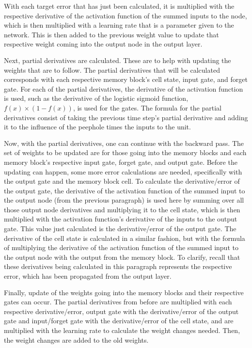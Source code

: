 \documentclass[11pt,letterpaper]{article}
\begin{document}
With each target error that has just been calculated, it is multiplied with the respective derivative of the activation function of the summed inputs to the node, which is then multiplied with a learning rate that is a parameter given to the network. This is then added to the previous weight value to update that respective weight coming into the output node in the output layer.

Next, partial derivatives are calculated. These are to help with updating the weights that are to follow. The partial derivatives that will be calculated corresponds with each respective memory block's cell state, input gate, and forget gate. For each of the partial derivatives, the derivative of the activation function is used, such as the derivative of the logistic sigmoid function, $f(x) \times (1 - f(x))$, is used for the gates. The formula for the partial derivatives consist of taking the previous time step's partial derivative and adding it to the influence of the peephole times the inputs to the unit.

Now, with the partial derivatives, one can continue with the backward pass. 
The set of weights to be updated are for those going into the memory blocks and each memory block's respective input gate, forget gate, and output gate. Before the updating can happen, some more error calculations are needed, specifically with the output gate and the memory block cell. To calculate the derivative/error of the output gate, the derivative of the activation function of the summed input to the output node (from the previous paragraph) is used here by summing over all those output node derivatives and multiplying it to the cell state, which is then multiplied with the activation function's derivative of the inputs to the output gate. This value just calculated is the derivative/error of the output gate. The derivative of the cell state is calculated in a similar fashion, but with the formula of multiplying the derivative of the activation function of the summed input to the output node with the output from the memory block. To clarify, recall that these derivatives being calculated in this paragraph represents the respective error, which has been propagated from the output layer.

Finally, update of the weights going into the memory blocks and their respective gates can occur. The partial derivatives from before are multiplied with each respective derivative/error, output gate with the derivative/error of the output gate and input/forget gate with the derivative/error of the cell state, and are multiplied with the learning rate to calculate the weight changes needed. Then, the weight changes are added to the old weights. 
\end{document}
